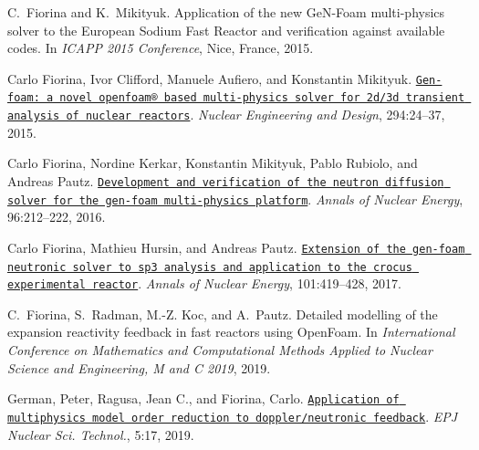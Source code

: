
\begin{DoxyDescription}
\item[\label{_CITEREF_Fiorina2015ApplicationCodes}%
\mbox{[}1\mbox{]}]C.~Fiorina and K.~Mikityuk. Application of the new Ge\+N-\/\+Foam multi-\/physics solver to the European Sodium Fast Reactor and verification against available codes. In {\itshape I\+C\+A\+PP 2015 Conference}, Nice, France, 2015.


\item[\label{_CITEREF_FIORINA201524}%
\mbox{[}2\mbox{]}]Carlo Fiorina, Ivor Clifford, Manuele Aufiero, and Konstantin Mikityuk. \href{https://www.sciencedirect.com/science/article/pii/S0029549315003829}{\tt Gen-\/foam\+: a novel openfoam® based multi-\/physics solver for 2d/3d transient analysis of nuclear reactors}. {\itshape Nuclear Engineering and Design}, 294\+:24--37, 2015. 


\item[\label{_CITEREF_FIORINA2016212}%
\mbox{[}3\mbox{]}]Carlo Fiorina, Nordine Kerkar, Konstantin Mikityuk, Pablo Rubiolo, and Andreas Pautz. \href{https://www.sciencedirect.com/science/article/pii/S0306454916303309}{\tt Development and verification of the neutron diffusion solver for the gen-\/foam multi-\/physics platform}. {\itshape Annals of Nuclear Energy}, 96\+:212--222, 2016. 


\item[\label{_CITEREF_FIORINA2017419}%
\mbox{[}4\mbox{]}]Carlo Fiorina, Mathieu Hursin, and Andreas Pautz. \href{https://www.sciencedirect.com/science/article/pii/S0306454916305126}{\tt Extension of the gen-\/foam neutronic solver to sp3 analysis and application to the crocus experimental reactor}. {\itshape Annals of Nuclear Energy}, 101\+:419--428, 2017. 


\item[\label{_CITEREF_Fiorina2019DetailedOpenFoam}%
\mbox{[}5\mbox{]}]C.~Fiorina, S.~Radman, M.-\/Z. Koc, and A.~Pautz. Detailed modelling of the expansion reactivity feedback in fast reactors using Open\+Foam. In {\itshape International Conference on Mathematics and Computational Methods Applied to Nuclear Science and Engineering, M and C 2019}, 2019.


\item[\label{_CITEREF_refId0}%
\mbox{[}6\mbox{]}]German, Peter, Ragusa, Jean C., and Fiorina, Carlo. \href{https://doi.org/10.1051/epjn/2019034}{\tt Application of multiphysics model order reduction to doppler/neutronic feedback}. {\itshape E\+PJ Nuclear Sci. Technol.}, 5\+:17, 2019. 



\end{DoxyDescription}
